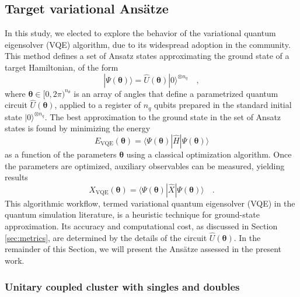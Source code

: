 \documentclass[aps,pra,twocolumn]{revtex4-2}
\newcommand{\bgreek}[1]{{\boldsymbol{#1}}}
\begin{document}
\subsection{Target variational Ans\"{a}tze}

In this study, we elected to explore the behavior of the variational quantum eigensolver (VQE) algorithm, due to its widespread adoption in the community.
This method defines a set of Ansatz states approximating the ground state of a target Hamiltonian, of the form 
\begin{equation}
| \Psi( \bgreek{\theta} ) \rangle = \hat{U}( \bgreek{\theta} ) | 0 \rangle^{\otimes n_q}
\quad,
\end{equation}
where $\bgreek{\theta} \in [0,2\pi)^{n_\theta}$ is an array of angles that define a parametrized quantum circuit $\hat{U}( \bgreek{\theta} )$, 
applied to a register of $n_q$ qubits prepared in the standard initial state $| 0 \rangle^{\otimes n_q}$.
The best approximation to the ground state in the set of Ansatz states is found by minimizing the energy 
\begin{equation}
E_{\mathrm{VQE}}( \bgreek{\theta} ) = \langle \Psi( \bgreek{\theta} ) | \hat{H} | \Psi( \bgreek{\theta} ) \rangle
\end{equation}
as a function of the parameters $\bgreek{\theta} $ using a classical optimization algorithm. 
Once the parameters are optimized, auxiliary observables can be measured, yielding results
\begin{equation}
X_{\mathrm{VQE}}( \bgreek{\theta} ) = \langle \Psi( \bgreek{\theta} ) | \hat{X} | \Psi( \bgreek{\theta} ) \rangle
\quad.
\end{equation}
This algorithmic workflow, termed variational quantum eigensolver (VQE) in the quantum simulation literature, 
is a heuristic technique for ground-state approximation. 
Its accuracy and computational cost, as discussed in Section \ref{sec:metrics}, are determined by the details of the circuit $\hat{U}( \bgreek{\theta} )$. 
In the remainder of this Section, we will present the Ans\"{a}tze assessed in the present work.

\subsubsection{Unitary coupled cluster with singles and doubles}
\end{document}
